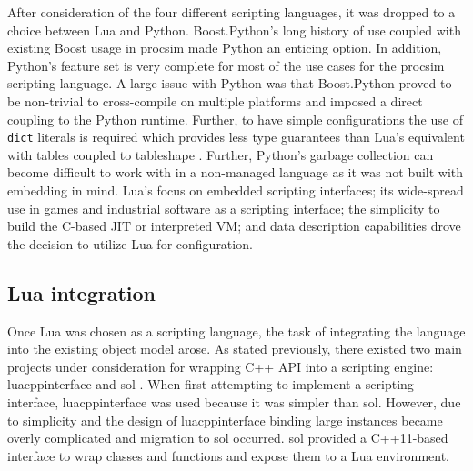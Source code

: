 After consideration of the four different scripting languages, it was dropped to a choice between Lua and Python. Boost.Python's long history of use coupled with existing Boost usage in procsim made Python an enticing option. In addition, Python's feature set is very complete for most of the use cases for the procsim scripting language. A large issue with Python was that Boost.Python proved to be non-trivial to cross-compile on multiple platforms and imposed a direct coupling to the Python runtime. Further, to have simple configurations the use of \texttt{dict} literals is required which provides less type guarantees than Lua's equivalent with tables coupled to tableshape \cite{Python:BuiltinTypes, Ierusalimschy:PIL, Github:leafto:tableshape}. Further, Python's garbage collection can become difficult to work with in a non-managed language as it was not built with embedding in mind. Lua's focus on embedded scripting interfaces; its wide-spread use in games and industrial software as a scripting interface; the simplicity to build the C-based JIT or interpreted VM; and data description capabilities drove the decision to utilize Lua for configuration. 

\subsection{Lua integration}

Once Lua was chosen as a scripting language, the task of integrating the language into the existing object model arose. As stated previously, there existed two main projects under consideration for wrapping C++ API into a scripting engine: luacppinterface \cite{Github:davidsiaw:luacppinterface} and sol \cite{Github:Rapptz:Sol}. When first attempting to implement a scripting interface, luacppinterface was used because it was simpler than sol. However, due to simplicity and the design of luacppinterface binding large  instances became overly complicated and migration to sol occurred. sol provided a C++11-based interface to wrap classes and functions and expose them to a Lua environment.

